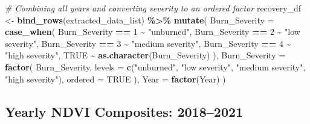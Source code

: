 \documentclass[
]{article}
\newenvironment{Shaded}{\begin{snugshade}}{\end{snugshade}}
\newcommand{\AttributeTok}[1]{\textcolor[rgb]{0.13,0.29,0.53}{#1}}
\newcommand{\CommentTok}[1]{\textcolor[rgb]{0.56,0.35,0.01}{\textit{#1}}}
\newcommand{\ConstantTok}[1]{\textcolor[rgb]{0.56,0.35,0.01}{#1}}
\newcommand{\DecValTok}[1]{\textcolor[rgb]{0.00,0.00,0.81}{#1}}
\newcommand{\FunctionTok}[1]{\textcolor[rgb]{0.13,0.29,0.53}{\textbf{#1}}}
\newcommand{\NormalTok}[1]{#1}
\newcommand{\OtherTok}[1]{\textcolor[rgb]{0.56,0.35,0.01}{#1}}
\newcommand{\SpecialCharTok}[1]{\textcolor[rgb]{0.81,0.36,0.00}{\textbf{#1}}}
\newcommand{\StringTok}[1]{\textcolor[rgb]{0.31,0.60,0.02}{#1}}
\begin{document}
\begin{Shaded}
\begin{Highlighting}[]
\CommentTok{\# Combining all years and converting severity to an ordered factor}
\NormalTok{recovery\_df }\OtherTok{\textless{}{-}} \FunctionTok{bind\_rows}\NormalTok{(extracted\_data\_list) }\SpecialCharTok{\%\textgreater{}\%}
  \FunctionTok{mutate}\NormalTok{(}
    \AttributeTok{Burn\_Severity =} \FunctionTok{case\_when}\NormalTok{(}
\NormalTok{      Burn\_Severity }\SpecialCharTok{==} \DecValTok{1} \SpecialCharTok{\textasciitilde{}} \StringTok{"unburned"}\NormalTok{,}
\NormalTok{      Burn\_Severity }\SpecialCharTok{==} \DecValTok{2} \SpecialCharTok{\textasciitilde{}} \StringTok{"low severity"}\NormalTok{,}
\NormalTok{      Burn\_Severity }\SpecialCharTok{==} \DecValTok{3} \SpecialCharTok{\textasciitilde{}} \StringTok{"medium severity"}\NormalTok{,}
\NormalTok{      Burn\_Severity }\SpecialCharTok{==} \DecValTok{4} \SpecialCharTok{\textasciitilde{}} \StringTok{"high severity"}\NormalTok{,}
      \ConstantTok{TRUE}               \SpecialCharTok{\textasciitilde{}} \FunctionTok{as.character}\NormalTok{(Burn\_Severity)}
\NormalTok{    ),}
    \AttributeTok{Burn\_Severity =} \FunctionTok{factor}\NormalTok{(}
\NormalTok{      Burn\_Severity,}
      \AttributeTok{levels  =} \FunctionTok{c}\NormalTok{(}\StringTok{"unburned"}\NormalTok{, }\StringTok{"low severity"}\NormalTok{, }\StringTok{"medium severity"}\NormalTok{, }\StringTok{"high severity"}\NormalTok{),}
      \AttributeTok{ordered =} \ConstantTok{TRUE}
\NormalTok{    ),}
    \AttributeTok{Year =} \FunctionTok{factor}\NormalTok{(Year)}
\NormalTok{  )}
\end{Highlighting}
\end{Shaded}

\subsection{Yearly NDVI Composites:
2018--2021}\label{yearly-ndvi-composites-20182021}
\end{document}
